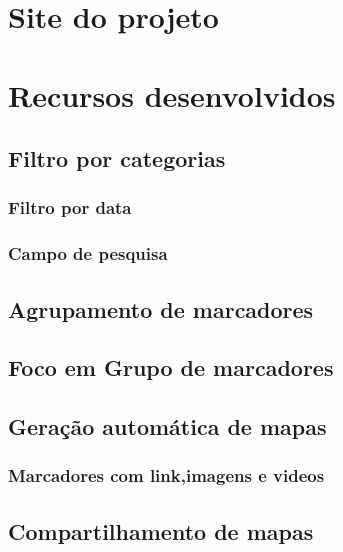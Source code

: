 \section{Site do projeto}
\section{Recursos desenvolvidos}
\subsection{Filtro por categorias}
\subsubsection{Filtro por data}
\subsubsection{Campo de pesquisa}

\subsection{Agrupamento de marcadores}
\subsection{Foco em Grupo de marcadores}

\subsection{Geração automática de mapas}
\subsubsection{Marcadores com link,imagens e videos}
\subsection{Compartilhamento de mapas}
